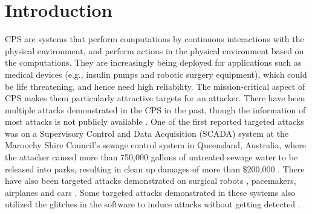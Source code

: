 
\chapter{Introduction }
\label{ch:Chapter1}
\ac{CPS} are systems that perform computations by continuous interactions with the physical environment, and perform actions in the physical environment based on the computations.   
They are increasingly being deployed for applications \cite{10.1145/2038642.2038685}\cite{10.1145/1837274.1837463} \cite{6051465} such as medical devices (e.g., insulin pumps and robotic surgery equipment),  which could be life threatening, and hence need high reliability. 
The mission-critical aspect of \ac{CPS} makes them particularly attractive targets for an attacker. 
There have been multiple attacks demonstrated in the \ac{CPS} in the past, though the information of most attacks is not publicly available \cite{doi:10.1080/13518040590969785}.
One of the first reported targeted attacks was on a Supervisory Control and Data Acquisition (SCADA) system \cite{article22} at the Maroochy Shire Council’s sewage control system in Queensland, Australia, where the attacker caused more than 750,000 gallons of untreated sewage water to be released into parks, resulting in clean up damages of more than \$200,000 \cite{10.1016/j.adhoc.2009.04.012}.
There have also been targeted attacks demonstrated on surgical robots \cite{7579758}, pacemakers\cite{4531149}, airplanes \cite{217595} and  cars \cite{10.5555/1929820.1929848}.
Some targeted attacks demonstrated in these systems also utilized the glitches in the software  to induce attacks without getting detected \cite{242054}. 




